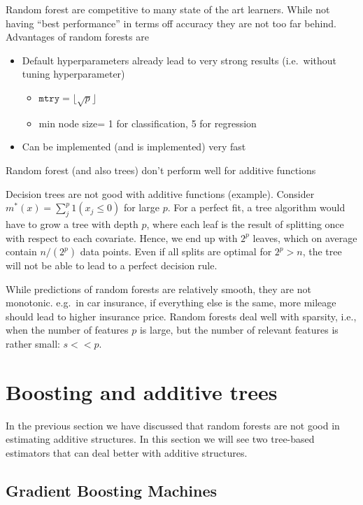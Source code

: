 \documentclass[a4paper,10pt,openany]{book}
\providecommand{\tightlist}{%
 \setlength{\itemsep}{0pt}\setlength{\parskip}{0pt}}
\begin{document}
Random forest are competitive to many state of the art learners. While not having ``best performance'' in terms off accuracy they are not too far behind. Advantages of random forests are

\begin{itemize}
\tightlist
\item
  Default hyperparameters already lead to very strong results (i.e.~without tuning hyperparameter)

  \begin{itemize}
  \tightlist
  \item
    \(\texttt {mtry}=\lfloor \sqrt{p}\rfloor\)
  \item
    min node size= 1 for classification, 5 for regression
  \end{itemize}
\item
  Can be implemented (and is implemented) very fast
\end{itemize}

Random forest (and also trees) don't perform well for additive functions

Decision trees are not good with additive functions (example). Consider \(m^\ast(x) = \sum_j^p 1(x_j \leq 0)\) for large \(p\). For a perfect fit, a tree algorithm would have to grow a tree with depth \(p\),
where each leaf is the result of splitting once with respect to each covariate. Hence, we end up with \(2^p\) leaves, which on average contain \(n/(2^p)\) data points. Even if all splits are optimal for \(2^p>n\), the tree will not be able to lead to a perfect decision rule.

While predictions of random forests are relatively smooth, they are not monotonic. e.g.~in car insurance, if everything else is the same, more mileage should lead to higher insurance price. Random forests deal well with sparsity, i.e., when the number of features \(p\) is large, but the number of relevant features is rather small: \(s<<p\).

\hypertarget{boosting-and-additive-trees}{%
\section{Boosting and additive trees}\label{boosting-and-additive-trees}}

In the previous section we have discussed that random forests are not good in estimating additive structures. In this section we will see two tree-based estimators that can deal better with additive structures.

\hypertarget{gradient-boosting-machines}{%
\subsection{Gradient Boosting Machines}\label{gradient-boosting-machines}}
\end{document}
